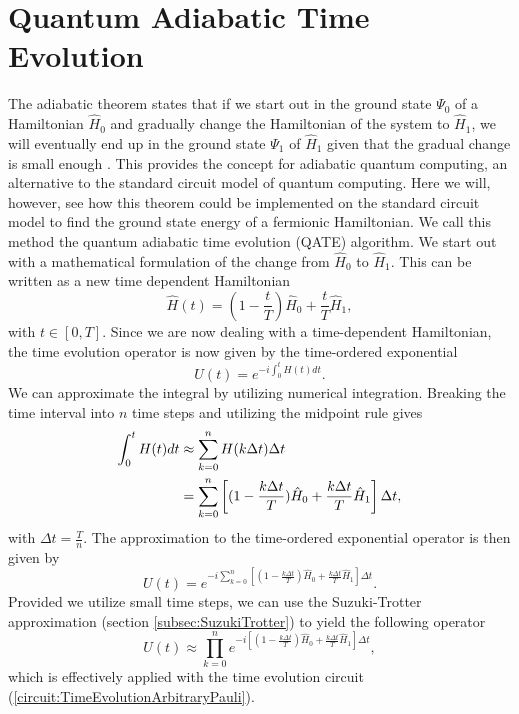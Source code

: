 \section{Quantum Adiabatic Time Evolution}
\label{sec:QATE}

The adiabatic theorem states that if we start out in the ground state $\Psi_0$ of a Hamiltonian $\hat{H}_0$ and gradually change the Hamiltonian of the system to $\hat{H}_1$, we will eventually end up in the ground state $\Psi_1$ of $\hat{H}_1$ given that the gradual change is small enough \cite{AdiabaticTimeEvolution}. This provides the concept for adiabatic quantum computing, an alternative to the standard circuit model of quantum computing. Here we will, however, see how this theorem could be implemented on the standard circuit model to find the ground state energy of a fermionic Hamiltonian. We call this method the quantum adiabatic time evolution (QATE) algorithm. We start out with a mathematical formulation of the change from $\hat{H}_0$ to $\hat{H}_1$. This can be written as a new time dependent Hamiltonian
\begin{equation}
    \label{eq:AdiabaticHamiltonian}
    \hat{H}(t) = (1-\frac{t}{T})\hat{H}_0 + \frac{t}{T}\hat{H}_1,
\end{equation}
with $t \in [0,T]$. Since we are now dealing with a time-dependent Hamiltonian, the time evolution operator is now given by the time-ordered exponential \cite{TimeOrderedExponential}
\begin{equation}
    \label{eq:QATETimeOrderedExponential}
    U(t) = e^{-i\int_0^t H(t) dt }.
\end{equation}
We can approximate the integral by utilizing numerical integration. Breaking the time interval into $n$ time steps and utilizing the midpoint rule \cite{midpointrule} gives
\begin{align}
    \label{eq:RectangularIntegration}
    \int_0^t H(t) dt &\approx \sum_{k=0}^{n}H(k\Delta t)\Delta t \notag \\
    &= \sum_{k=0}^{n} \left[(1-\frac{k\Delta t}{T})\hat{H}_0 + \frac{k\Delta t}{T}\hat{H}_1 \right] \Delta t,
\end{align}
with $\Delta t = \frac{T}{n}$.
The approximation to the time-ordered exponential operator is then given by
\begin{equation}
    \label{eq:TimeOrderedExponentialNumericalIntegration}
    U(t) = e^{-i\sum_{k=0}^{n} \left[(1-\frac{k\Delta t}{T})\hat{H}_0 + \frac{k\Delta t}{T}\hat{H}_1 \right] \Delta t}.
\end{equation}
Provided we utilize small time steps, we can use the Suzuki-Trotter approximation (section \ref{subsec:SuzukiTrotter}) to yield the following operator
\begin{equation}
    \label{eq:QATETrotterApproximation}
    U(t) \approx \prod_{k=0}^{n}e^{-i\left[(1-\frac{k\Delta t}{T})\hat{H}_0 + \frac{k\Delta t}{T}\hat{H}_1 \right] \Delta t},
\end{equation}
which is effectively applied with the time evolution circuit (\ref{circuit:TimeEvolutionArbitraryPauli}).

